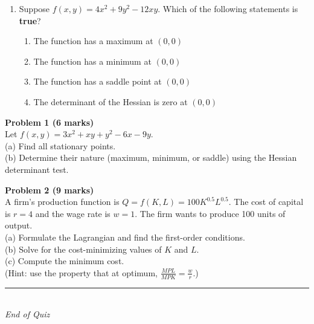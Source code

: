 \documentclass[12pt]{article}
\begin{document}
\begin{enumerate}
\vspace{0.5em}

\item Suppose $f(x,y) = 4x^2 + 9y^2 - 12xy$. Which of the following statements is \textbf{true}?
\begin{enumerate}
\item The function has a maximum at $(0,0)$
\item The function has a minimum at $(0,0)$
\item The function has a saddle point at $(0,0)$
\item The determinant of the Hessian is zero at $(0,0)$
\end{enumerate}

\end{enumerate}

\vspace{1em}




\noindent \textbf{Problem 1 (6 marks)}\\
Let $f(x,y) = 3x^2 + xy + y^2 - 6x - 9y$.\\[4pt]
(a) Find all stationary points.\\
(b) Determine their nature (maximum, minimum, or saddle) using the Hessian determinant test.

\vspace{1em}

 \noindent \textbf{Problem 2 (9 marks)}\\
A firm’s production function is $Q = f(K,L) = 100K^{0.5}L^{0.5}$. The cost of capital is $r = 4$ and the wage rate is $w = 1$. The firm wants to produce 100 units of output.\\[4pt]
(a) Formulate the Lagrangian and find the first-order conditions.\\
(b) Solve for the cost-minimizing values of $K$ and $L$.\\
(c) Compute the minimum cost.\\
(Hint: use the property that at optimum, $\frac{MPL}{MPK} = \frac{w}{r}$.)


\vfill
\noindent\rule{\textwidth}{0.4pt}\\
\textit{End of Quiz}
\end{document}
